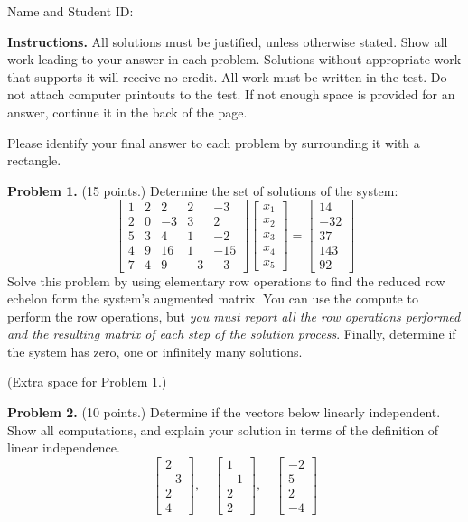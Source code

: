 \documentclass[12pt]{article}
\begin{document}
Name and Student ID: \hrulefill


\textbf{Instructions.} All solutions must be justified, unless otherwise stated. Show all work leading to your answer in each problem. Solutions without appropriate work that supports it will receive no credit. All work must be written in the test. Do not attach computer printouts to the test. If not enough space is provided for an answer, continue it in the back of the page.

Please identify your final answer to each problem by surrounding it with a rectangle.


\textbf{Problem 1.} (15 points.) Determine the set of solutions of the system:
\[
\left[\begin{matrix}1 & 2 & 2 & 2 & -3\\2 & 0 & -3 & 3 & 2\\5 & 3 & 4 & 1 & -2\\4 & 9 & 16 & 1 & -15\\7 & 4 & 9 & -3 & -3\end{matrix}\right]
\begin{bmatrix}x_1\\x_2\\x_3\\x_4\\x_5\end{bmatrix}=
\left[\begin{matrix}14\\-32\\37\\143\\92\end{matrix}\right]
\]
Solve this problem by using elementary row operations to find the reduced row echelon form the system's augmented matrix. You can use the compute to perform the row operations, but \emph{you must report all the row operations performed and the resulting matrix of each step of the solution process}.  
Finally, determine if the system has zero, one or infinitely many solutions.

\vfill
\clearpage
(Extra space for Problem 1.)

\clearpage

\textbf{Problem 2.} (10 points.) 
Determine if the vectors below linearly independent. Show all computations, and explain your solution in terms of the definition of linear independence.
\[
\left[\begin{matrix}2\\-3\\2\\4\end{matrix}\right],\quad
\left[\begin{matrix}1\\-1\\2\\2\end{matrix}\right],\quad
\left[\begin{matrix}-2\\5\\2\\-4\end{matrix}\right]
\]
\end{document}
